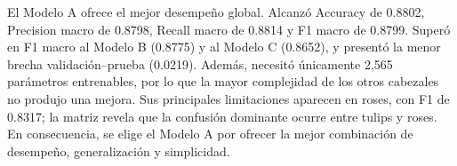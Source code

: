 El Modelo A ofrece el mejor desempeño global. Alcanzó Accuracy de 0.8802, Precision macro de 0.8798, Recall macro de 0.8814 y F1 macro de 0.8799. Superó en F1 macro al Modelo B (0.8775) y al Modelo C (0.8652), y presentó la menor brecha validación--prueba (0.0219). Además, necesitó únicamente 2,565 parámetros entrenables, por lo que la mayor complejidad de los otros cabezales no produjo una mejora. Sus principales limitaciones aparecen en roses, con F1 de 0.8317; la matriz revela que la confusión dominante ocurre entre tulips y roses. En consecuencia, se elige el Modelo A por ofrecer la mejor combinación de desempeño, generalización y simplicidad.